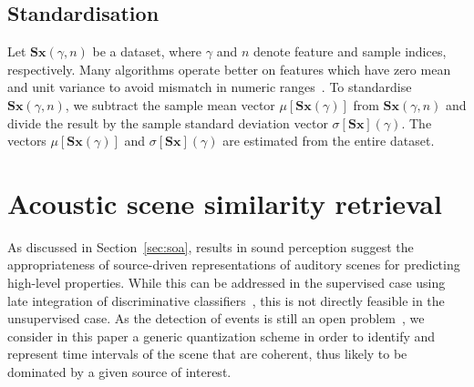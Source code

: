 \documentclass[smallextended]{svjour3}
\begin{document}
\subsection{Standardisation}
\label{sec:stand}

Let $\mathbf{S}\boldsymbol{x}(\gamma,n)$ be a dataset, where $\gamma$ and $n$ denote feature and sample indices, respectively.
Many algorithms operate better on features which have zero mean and unit variance to avoid mismatch in numeric ranges~\cite{Hsu2003}.
To standardise $\mathbf{S}\boldsymbol{x}(\gamma,n)$, we subtract the sample mean vector $\mu[\mathbf{S}\boldsymbol{x}(\gamma)]$ from $\mathbf{S}\boldsymbol{x}(\gamma,n)$ and divide the result by the sample standard deviation vector $\sigma[\mathbf{S}\boldsymbol{x}] (\gamma)$.
The vectors $\mu[\mathbf{S}\boldsymbol{x}(\gamma)]$ and $\sigma[\mathbf{S}\boldsymbol{x}](\gamma)$ are estimated from the entire dataset.

\section{Acoustic scene similarity retrieval}
\label{sec:object}



As discussed in Section~\ref{sec:soa}, results in sound perception suggest the appropriateness of source-driven representations of auditory scenes for predicting high-level properties. While this can be addressed in the supervised case using late integration of discriminative classifiers~\cite{Anden2014}, this is not directly feasible in the unsupervised case. As the detection of events is still an open problem~\cite{7100934}, we consider in this paper a generic quantization scheme in order to identify and represent time intervals of the scene that are coherent, thus likely to be dominated by a given source of interest.
\end{document}
